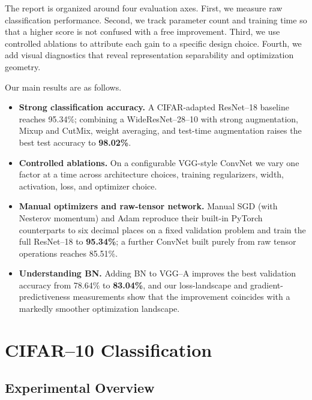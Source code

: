 \documentclass[11pt]{article}
\newcommand{\bestAcc}{98.02}     %
\newcommand{\baseAcc}{95.34}     %
\newcommand{\manualAcc}{95.34}   %
\newcommand{\manualNetAcc}{85.51} %
\newcommand{\bnStdAcc}{78.64}    %
\newcommand{\bnBnAcc}{83.04}     %
\begin{document}
The report is organized around four evaluation axes. First, we measure raw
classification performance. Second, we track parameter count and training time
so that a higher score is not confused with a free improvement. Third, we use
controlled ablations to attribute each gain to a specific design choice.
Fourth, we add visual diagnostics that reveal representation separability and
optimization geometry.

Our main results are as follows.
\begin{itemize}
  \item \textbf{Strong classification accuracy.} A CIFAR-adapted ResNet--18
        baseline reaches \baseAcc\%; combining a WideResNet--28--10 with strong
        augmentation, Mixup and CutMix, weight averaging, and test-time
        augmentation raises the best test accuracy to \textbf{\bestAcc\%}.
  \item \textbf{Controlled ablations.} On a configurable VGG-style ConvNet we
        vary one factor at a time across architecture choices,
        training regularizers, width, activation, loss, and optimizer choice.
  \item \textbf{Manual optimizers and raw-tensor network.} Manual SGD (with
        Nesterov momentum) and Adam reproduce their built-in PyTorch
        counterparts to six decimal places on a fixed validation problem and
        train the full ResNet--18 to \textbf{\manualAcc\%}; a further ConvNet
        built purely from raw tensor operations reaches \manualNetAcc\%.
  \item \textbf{Understanding BN.} Adding BN to VGG--A improves the best
        validation accuracy from \bnStdAcc\% to \textbf{\bnBnAcc\%}, and our
        loss-landscape and gradient-predictiveness measurements show that the
        improvement coincides with a markedly smoother optimization landscape.
\end{itemize}

\section{CIFAR--10 Classification}
\label{sec:part1}

\subsection{Experimental Overview}
\label{sec:part1score}
\end{document}
